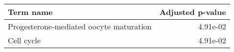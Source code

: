 \begin{tabular}{lr}
\toprule
                               Term name &  Adjusted p-value \\
\midrule
 Progesterone-mediated oocyte maturation &          4.91e-02 \\
                              Cell cycle &          4.91e-02 \\
\bottomrule
\end{tabular}
